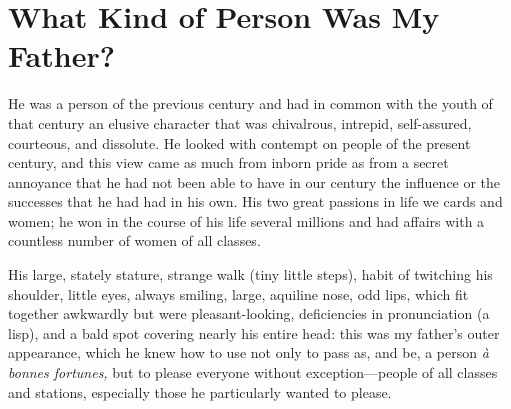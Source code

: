 \chapter{What Kind of Person Was My Father?} %

He was a person of the previous century and had in common with the youth of that century an elusive character that was chivalrous, intrepid, self-assured, courteous, and dissolute. He looked with contempt on people of the present century, and this view came as much from inborn pride as from a secret annoyance that he had not been able to have in our century the influence or the successes that he had had in his own. His two great passions in life we cards and women; he won in the course of his life several millions and had affairs with a countless number of women of all classes.

His large, stately stature, strange walk (tiny little steps), habit of twitching his shoulder, little eyes, always smiling, large, aquiline nose, odd lips, which fit together awkwardly but were pleasant-looking, deficiencies in pronunciation (a lisp), and a bald spot covering nearly his entire head: this was my father's outer appearance, which he knew how to use not only to pass as, and be, a person \textit{\`a bonnes fortunes,} but to please everyone without exception---people of all classes and stations, especially those he particularly wanted to please.

